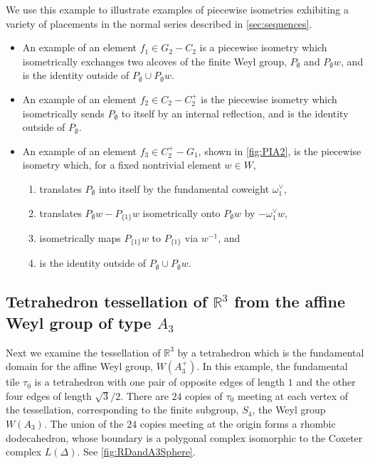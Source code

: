 \documentclass[11pt]{amsart}
\def\R{\mathbb{R}}
\numberwithin{table}{section}
\numberwithin{figure}{section}
\theoremstyle{remark}
\begin{document}
We use this example to illustrate examples of piecewise isometries
exhibiting a variety of placements in the normal series described in
\cref{sec:sequences}. 
\begin{itemize}
  \item An example of an element $f_1 \in G_2 - C_2$ is a piecewise isometry which
isometrically exchanges two alcoves of the finite Weyl group,
$P_\emptyset$ and $P_\emptyset w$, and is the identity outside of
$P_\emptyset \cup P_\emptyset w$.
\item An example of an element 
$f_2\in C_2 - C_2^+$ is the piecewise isometry which isometrically sends
$P_\emptyset$ to itself by an internal reflection, and is the identity
outside of $P_\emptyset$.
\item An example of an element $f_3 \in C_2^+ - G_1$, shown in 
  \cref{fig:PIA2}, is the piecewise isometry which, for a fixed
  nontrivial element $w\in W$,
\begin{enumerate}
\item translates $P_\emptyset$ into itself by the fundamental coweight
  $\omega^\vee_1$,
\item translates $P_\emptyset w -  P_{\{1\}}w$ isometrically onto
  $P_\emptyset w$ by $- \omega^\vee_1 w$,
\item isometrically maps $P_{\{1\}} w$ to $P_{\{1\}}$ via
  $w^{-1}$, and
\item is the identity outside of
  $P_\emptyset \cup P_{\emptyset} w$.
\end{enumerate}
\end{itemize}

\subsection{Tetrahedron tessellation of $\R^3$ from the affine Weyl group of type $A_3$}

Next we examine the tessellation of $\R^3$ by a tetrahedron which is
the fundamental domain for the affine Weyl group, $W(A_3^+)$.  In this
example, the fundamental tile $\tau_0$ is a tetrahedron with one pair
of opposite edges of length $1$ and the other four edges of length
$\sqrt{3}/2$. There are $24$ copies of $\tau_0$ meeting at each vertex
of the tessellation, corresponding to the finite subgroup, $S_4$, the
Weyl group $W(A_3)$. The union of the $24$ copies meeting at the
origin forms a rhombic dodecahedron, whose boundary is a polygonal
complex isomorphic to the Coxeter complex $L(\Delta)$. See 
\cref{fig:RDandA3Sphere}.
\end{document}
